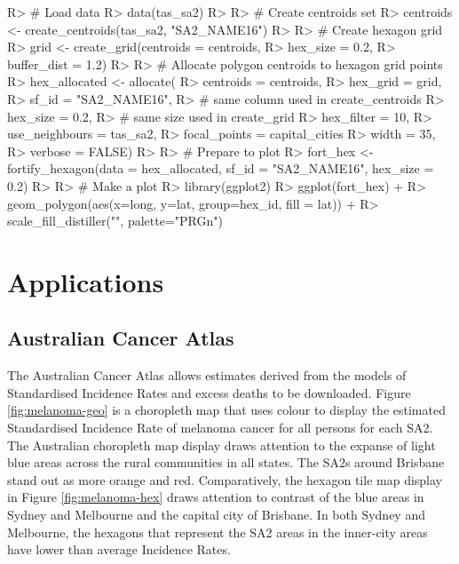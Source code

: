 \documentclass[
]{jss}
\begin{document}
\begin{CodeChunk}

\begin{CodeInput}
R> # Load data
R> data(tas_sa2)
R> 
R> # Create centroids set
R> centroids <- create_centroids(tas_sa2, "SA2_NAME16")
R> 
R> # Create hexagon grid
R> grid <- create_grid(centroids = centroids,
R>     hex_size = 0.2,
R>     buffer_dist = 1.2)
R> 
R> # Allocate polygon centroids to hexagon grid points
R> hex_allocated <- allocate(
R>   centroids = centroids,
R>   hex_grid = grid,
R>   sf_id = "SA2_NAME16",
R>   # same column used in create_centroids
R>   hex_size = 0.2,
R>   # same size used in create_grid
R>   hex_filter = 10,
R>   use_neighbours = tas_sa2,
R>   focal_points = capital_cities %
R>   width = 35,
R>   verbose = FALSE)
R> 
R> # Prepare to plot
R> fort_hex <- fortify_hexagon(data = hex_allocated, sf_id = "SA2_NAME16", hex_size = 0.2)
R> 
R> # Make a plot
R> library(ggplot2)
R> ggplot(fort_hex) + 
R>   geom_polygon(aes(x=long, y=lat, group=hex_id, fill = lat)) +
R>   scale_fill_distiller("", palette="PRGn")
\end{CodeInput}
\end{CodeChunk}

\hypertarget{applications}{%
\section{Applications}\label{applications}}

\hypertarget{australian-cancer-atlas}{%
\subsection{Australian Cancer Atlas}\label{australian-cancer-atlas}}

The Australian Cancer Atlas \citep{TACA} allows estimates derived from
the models of Standardised Incidence Rates and excess deaths to be
downloaded. Figure \ref{fig:melanoma-geo} is a choropleth map that uses
colour to display the estimated Standardised Incidence Rate of melanoma
cancer for all persons for each SA2. The Australian choropleth map
display draws attention to the expanse of light blue areas across the
rural communities in all states. The SA2s around Brisbane stand out as
more orange and red. Comparatively, the hexagon tile map display in
Figure \ref{fig:melanoma-hex} draws attention to contrast of the blue
areas in Sydney and Melbourne and the capital city of Brisbane. In both
Sydney and Melbourne, the hexagons that represent the SA2 areas in the
inner-city areas have lower than average Incidence Rates.
\end{document}
